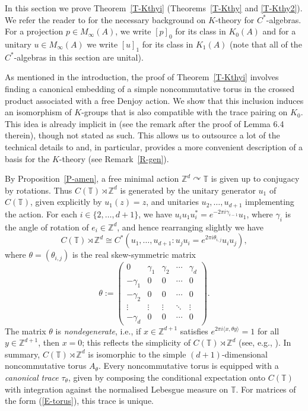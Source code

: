\documentclass[11pt,a4paper,leqno]{amsart}
\theoremstyle{definition}
\theoremstyle{remark}
\numberwithin{equation}{section}
\theoremstyle{plain}
\newcommand{\Zb}{\mathbb{Z}}
\newcommand{\Tb}{\mathbb{T}}
\begin{document}
In this section we prove Theorem~\ref{T-Kthyi} (Theorems~\ref{T-Kthy} and \ref{T-Kthy2}). We refer the reader to \cite{RorLarLau00} for the necessary background on $K$-theory for $C^*$-algebras. For a projection $p\in M_\infty(A)$, we write $[p]_0$ for its class in $K_0(A)$ and for a unitary $u\in M_\infty(A)$ we write $[u]_1$ for its class in $K_1(A)$ (note that all of the $C^*$-algebras in this section are unital). 

As mentioned in the introduction, the proof of Theorem~\ref{T-Kthyi} involves finding a canonical embedding of a simple noncommutative torus in the crossed product associated with a free Denjoy action. We show that this inclusion induces an isomorphism of $K$-groups that is also compatible with the trace pairing on $K_0$. This idea is already implicit in \cite{PutSchSka86} (see the remark after the proof of Lemma 6.4 therein), though not stated as such. This allows us to outsource a lot of the technical details to \cite{Ell84} and, in particular, provides a more convenient description of a basis for the $K$-theory (see Remark~\ref{R-gen}).   

By Proposition~\ref{P-amen}, a free minimal action $\Zb^d\curvearrowright \Tb$ is given up to conjugacy by rotations. Thus $C(\Tb) \rtimes \Zb^d$ is generated by the unitary generator $u_1$ of $C(\Tb)$, given explicitly by $u_1(z) = z$, and unitaries $u_2,\ldots,u_{d+1}$ implementing the action. For each $i \in \{2,\ldots,d+1\}$, we have $u_i u_1 u_i^* = e^{-2\pi i \gamma_{i-1}}u_1$, where $\gamma_i$ is the angle of rotation of $e_i\in \Zb^d$, and hence rearranging slightly we have 
\[
	C(\Tb) \rtimes \Zb^d \cong C^*(u_1,\ldots,u_{d+1} : u_ju_i = e^{2\pi i \theta_{i,j}}u_iu_j), 
\]
where $\theta = (\theta_{i,j})$ is the real skew-symmetric matrix 
\begin{equation}
	\theta := \begin{pmatrix}
		0 & \gamma_1 & \gamma_2 & \cdots & \gamma_d \\
		-\gamma_1 & 0 & 0 & \cdots & 0\\
		-\gamma_2 & 0 & 0 & \cdots & 0\\
		\vdots & \vdots & \vdots & \ddots & \vdots \\
		-\gamma_d & 0 & 0 & \cdots & 0
	\end{pmatrix}. \label{E-torus}
\end{equation}
The matrix $\theta$ is \emph{nondegenerate}, i.e., if $x\in \Zb^{d+1}$ satisfies $e^{2\pi i\langle x, \theta y\rangle} = 1$ for all $y\in \Zb^{d+1}$, then $x=0$; this reflects the simplicity of $C(\Tb)\rtimes \Zb^d$ (see, e.g., \cite{Phi06}). In summary, $C(\Tb)\rtimes \Zb^d$ is isomorphic to the simple $(d+1)$-dimensional noncommutative torus $A_\theta$. Every noncommutative torus is equipped with a \emph{canonical trace} $\tau_\theta$, given by composing the conditional expectation onto $C(\Tb)$ with integration against the normalised Lebesgue measure on $\Tb$. For matrices of the form (\ref{E-torus}), this trace is unique.  
\end{document}

